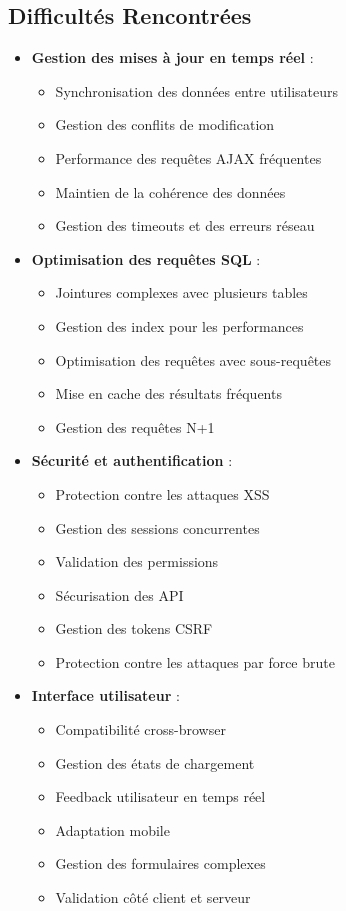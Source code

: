 \documentclass[12pt,a4paper]{article}
\begin{document}
\subsection{Difficultés Rencontrées}
\begin{itemize}
    \item \textbf{Gestion des mises à jour en temps réel} :
    \begin{itemize}
        \item Synchronisation des données entre utilisateurs
        \item Gestion des conflits de modification
        \item Performance des requêtes AJAX fréquentes
        \item Maintien de la cohérence des données
        \item Gestion des timeouts et des erreurs réseau
    \end{itemize}

    \item \textbf{Optimisation des requêtes SQL} :
    \begin{itemize}
        \item Jointures complexes avec plusieurs tables
        \item Gestion des index pour les performances
        \item Optimisation des requêtes avec sous-requêtes
        \item Mise en cache des résultats fréquents
        \item Gestion des requêtes N+1
    \end{itemize}

    \item \textbf{Sécurité et authentification} :
    \begin{itemize}
        \item Protection contre les attaques XSS
        \item Gestion des sessions concurrentes
        \item Validation des permissions
        \item Sécurisation des API
        \item Gestion des tokens CSRF
        \item Protection contre les attaques par force brute
    \end{itemize}

    \item \textbf{Interface utilisateur} :
    \begin{itemize}
        \item Compatibilité cross-browser
        \item Gestion des états de chargement
        \item Feedback utilisateur en temps réel
        \item Adaptation mobile
        \item Gestion des formulaires complexes
        \item Validation côté client et serveur
    \end{itemize}


\end{itemize}
\end{document}
